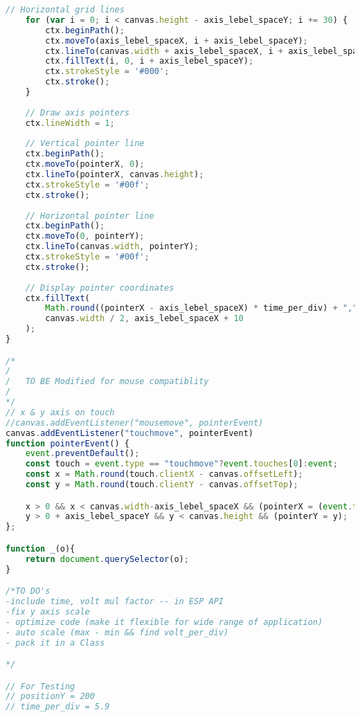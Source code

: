\begin{lstlisting}[style=htmlcssjs, language=JavaScript]
    // Horizontal grid lines
    for (var i = 0; i < canvas.height - axis_lebel_spaceY; i += 30) {
        ctx.beginPath();
        ctx.moveTo(axis_lebel_spaceX, i + axis_lebel_spaceY);
        ctx.lineTo(canvas.width + axis_lebel_spaceX, i + axis_lebel_spaceY);
        ctx.fillText(i, 0, i + axis_lebel_spaceY);
        ctx.strokeStyle = '#000';
        ctx.stroke();
    }
    
    // Draw axis pointers
    ctx.lineWidth = 1;
    
    // Vertical pointer line
    ctx.beginPath();
    ctx.moveTo(pointerX, 0);
    ctx.lineTo(pointerX, canvas.height);
    ctx.strokeStyle = '#00f';
    ctx.stroke();
    
    // Horizontal pointer line
    ctx.beginPath();
    ctx.moveTo(0, pointerY);
    ctx.lineTo(canvas.width, pointerY);
    ctx.strokeStyle = '#00f';
    ctx.stroke();
    
    // Display pointer coordinates
    ctx.fillText(
        Math.round((pointerX - axis_lebel_spaceX) * time_per_div) + "," + (canvas.height - pointerY),
        canvas.width / 2, axis_lebel_spaceX + 10
    );
}

/*
/
/   TO BE Modified for mouse compatiblity
/
*/
// x & y axis on touch
//canvas.addEventListener("mousemove", pointerEvent)
canvas.addEventListener("touchmove", pointerEvent)
function pointerEvent() {
    event.preventDefault();
    const touch = event.type == "touchmove"?event.touches[0]:event;
    const x = Math.round(touch.clientX - canvas.offsetLeft);
    const y = Math.round(touch.clientY - canvas.offsetTop);

    x > 0 && x < canvas.width-axis_lebel_spaceX && (pointerX = (event.type == "touchmove"?canvas.width-x:x));
    y > 0 + axis_lebel_spaceY && y < canvas.height && (pointerY = y);
};

function _(o){
    return document.querySelector(o);
}

/*TO DO's
-include time, volt mul factor -- in ESP API
-fix y axis scale
- optimize code (make it flexible for wide range of application)
- auto scale (max - min && find volt_per_div)
- pack it in a Class

*/

// For Testing 
// positionY = 200
// time_per_div = 5.9
\end{lstlisting}